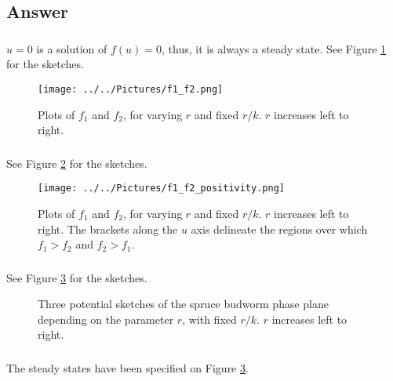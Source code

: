 \documentclass[]{article}
\newcommand{\fig}[1]{Figure \ref{#1}}
\newcommand{\tttp}{.32\textwidth}
\begin{document}
\begin{enumerate}
\end{enumerate}

\begin{Answ}
\subsection{Answer}
\subsubsection{}
$u=0$ is a solution of $f(u)=0$, thus, it is always a steady state. See \fig{f1_f2} for the sketches.
\begin{figure}[h!!!tb]
\centering
\texttt{[image: ../../Pictures/f1\_f2.png]}
\caption{\label{f1_f2} Plots of $f_1$ and $f_2$, for varying $r$ and fixed $r/k$. $r$ increases left to right.}
\end{figure}
\subsubsection{}
See \fig{f1_f2_positivity} for the sketches.
\begin{figure}[h!!!tb]
\texttt{[image: ../../Pictures/f1\_f2\_positivity.png]}
\caption{\label{f1_f2_positivity} Plots of $f_1$ and $f_2$, for varying $r$ and fixed $r/k$. $r$ increases left to right. The brackets along the $u$ axis delineate the regions over which $f_1>f_2$ and $f_2>f_1$.}
\end{figure}
\subsubsection{}
See \fig{Spruce_budworm_arrowed} for the sketches.
\begin{figure}[h!!!]
\centering
{}
\caption{\label{Spruce_budworm_arrowed} Three potential sketches of the spruce budworm phase plane depending on the parameter $r$, with fixed $r/k$. $r$ increases left to right.}
\end{figure}
\subsubsection{}
The steady states have been specified on \fig{Spruce_budworm_arrowed}.

\end{Answ}
\end{document}
